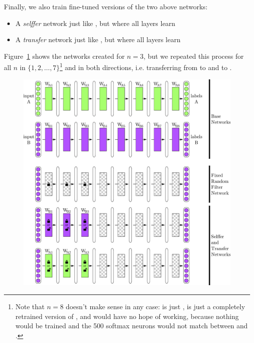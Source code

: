 Finally, we also train fine-tuned versions of the two above networks:

\begin{itemize}
\item A \emph{selffer} network  just like , but where all layers learn
\item A \emph{transfer} network  just like , but where all layers learn
\end{itemize}

Figure~\ref{fig:transfer} shows the networks created for $n = 3$, but we repeated this process for all $n$ in $\{1, 2, \ldots, 7\}$\footnote{Note that $n=8$ doesn't make sense in any case:  is just ,  is just a completely retrained version of , and  would have no hope of working, because nothing would be trained and the 500 softmax neurons would not match between \dA and \dB.} and in both directions, i.e. transferring from \dA to \dB and \dB to \dA.


\begin{figure}[htpb]
\begin{center}
\includegraphics[width=1\linewidth]{drawings/transfer.pdf}
\end{center}
\caption{}
\label{fig:transfer}
\end{figure}






